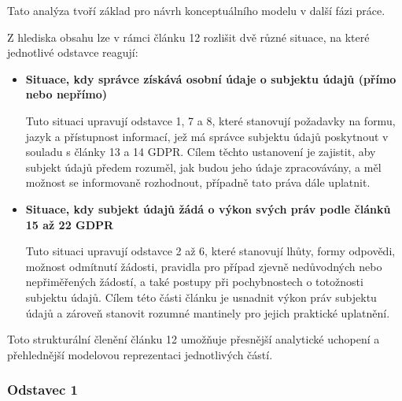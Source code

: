 \noindent Tato analýza tvoří základ pro návrh konceptuálního modelu v další fázi práce. 

Z hlediska obsahu lze v rámci článku 12 rozlišit dvě různé situace, na které jednotlivé odstavce reagují:
\begin{itemize}
  \item \textbf{Situace, kdy správce získává osobní údaje o subjektu údajů (přímo nebo nepřímo)}
  
  Tuto situaci upravují odstavce 1, 7 a 8, které stanovují požadavky na formu, jazyk a přístupnost informací, jež má správce subjektu údajů poskytnout v souladu s články 13 a 14 GDPR.
  Cílem těchto ustanovení je zajistit, aby subjekt údajů předem rozuměl, jak budou jeho údaje zpracovávány, a měl možnost se informovaně rozhodnout, případně tato práva dále uplatnit.
  \item \textbf{Situace, kdy subjekt údajů žádá o výkon svých práv podle článků 15 až 22 GDPR}
  
  Tuto situaci upravují odstavce 2 až 6, které stanovují lhůty, formy odpovědi, možnost odmítnutí žádosti, pravidla pro případ zjevně nedůvodných nebo nepřiměřených žádostí, a také postupy při pochybnostech o totožnosti subjektu údajů.
  Cílem této části článku je usnadnit výkon práv subjektu údajů a zároveň stanovit rozumné mantinely pro jejich praktické uplatnění.
\end{itemize}

\noindent Toto strukturální členění článku 12 umožňuje přesnější analytické uchopení a přehlednější modelovou reprezentaci jednotlivých částí.


\subsubsection{Odstavec 1}
\label{sec:odstavec-1}
\begin{displayquote}
 \cite{clanek12}
\end{displayquote}

